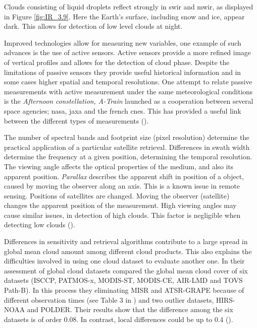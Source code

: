 Clouds consisting of liquid droplets reflect strongly in \acrfull{swir} and \acrfull{mwir}, as displayed in Figure \ref{fig:IR_3.9}. Here the Earth's surface, including snow and ice, appear dark. This allows for detection of low level clouds at night. 

Improved technologies allow for measuring new variables, one example of such advances is the use of active sensors. Active sensors provide a more refined image of vertical profiles and allows for the detection of cloud phase. Despite the limitations of passive sensors they provide useful historical information and in some cases higher spatial and temporal resolutions. One attempt to relate passive measurements with active measurement under the same meteorological conditions is the \textit{Afternoon constellation, A-Train} launched as a cooperation between several space agencies; \acrfull{nasa}, \acrlong{jaxa} and the french \acrfull{cnes}. This has provided a useful link between the different types of measurements (\cite{Stephens2018CloudsatSystem}). 

The number of spectral bands and footprint size (pixel resolution) determine the practical application of a particular satellite retrieval. Differences in swath width determine the frequency at a given position, determining the temporal resolution. The viewing angle affects the optical properties of the medium, and also its apparent position. \textit{Parallax} describes the apparent shift in position of a object, caused by moving the observer along an axis. This is a known issue in remote sensing. Positions of satellites are changed. Moving the observer (satellite) changes the apparent position of the measurement. 
High viewing angles may cause similar issues, in detection of high clouds. This factor is negligible when detecting low clouds (\cite{Joro2010ComparisonFinland}). 

Differences in sensitivity and retrieval algorithms contribute to a large spread in global mean cloud amount among different cloud products. This also explains the difficulties involved in using one cloud dataset to evaluate another one. In their assessment of global cloud datasets  compared the global mean cloud cover of six datasets (ISCCP, PATMOS-x, MODIS-ST, MODIS-CE, AIR-LMD and TOVS Path-B). In this process they eliminating MISR and ATSR-GRAPE because of different observation times (see Table 3 in  ) and two outlier datasets, HIRS-NOAA and POLDER. Their results show that the difference among the six datasets is of order 0.08. In contrast, local differences could be up to 0.4 (\cite{Stubenrauch2013AssessmentPanel}). 

